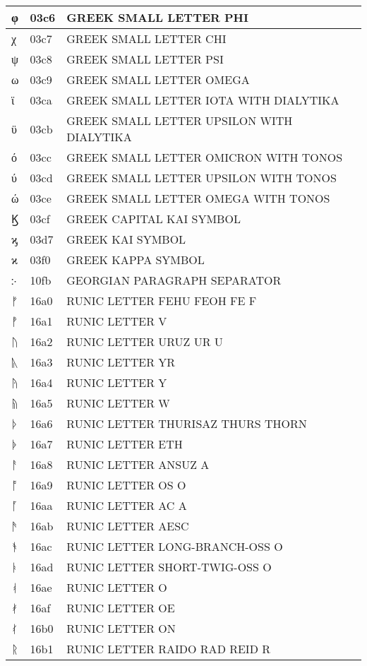 \documentclass[12pt,letterpaper,openany]{book}
\begin{document}
\begin{center}
\begin{supertabular}{|m{0.25in}|m{0.5in}|m{4in}|}
			φ & 03c6 & GREEK SMALL LETTER PHI\\\hline
			χ & 03c7 & GREEK SMALL LETTER CHI\\\hline
			ψ & 03c8 & GREEK SMALL LETTER PSI\\\hline
			ω & 03c9 & GREEK SMALL LETTER OMEGA\\\hline
			ϊ & 03ca & GREEK SMALL LETTER IOTA WITH DIALYTIKA\\\hline
			ϋ & 03cb & GREEK SMALL LETTER UPSILON WITH DIALYTIKA\\\hline
			ό & 03cc & GREEK SMALL LETTER OMICRON WITH TONOS\\\hline
			ύ & 03cd & GREEK SMALL LETTER UPSILON WITH TONOS\\\hline
			ώ & 03ce & GREEK SMALL LETTER OMEGA WITH TONOS\\\hline
			Ϗ & 03cf & GREEK CAPITAL KAI SYMBOL\\\hline
			ϗ & 03d7 & GREEK KAI SYMBOL\\\hline
			ϰ & 03f0 & GREEK KAPPA SYMBOL\\\hline
			჻ & 10fb & GEORGIAN PARAGRAPH SEPARATOR\\\hline
			ᚠ & 16a0 & RUNIC LETTER FEHU FEOH FE F\\\hline
			ᚡ & 16a1 & RUNIC LETTER V\\\hline
			ᚢ & 16a2 & RUNIC LETTER URUZ UR U\\\hline
			ᚣ & 16a3 & RUNIC LETTER YR\\\hline
			ᚤ & 16a4 & RUNIC LETTER Y\\\hline
			ᚥ & 16a5 & RUNIC LETTER W\\\hline
			ᚦ & 16a6 & RUNIC LETTER THURISAZ THURS THORN\\\hline
			ᚧ & 16a7 & RUNIC LETTER ETH\\\hline
			ᚨ & 16a8 & RUNIC LETTER ANSUZ A\\\hline
			ᚩ & 16a9 & RUNIC LETTER OS O\\\hline
			ᚪ & 16aa & RUNIC LETTER AC A\\\hline
			ᚫ & 16ab & RUNIC LETTER AESC\\\hline
			ᚬ & 16ac & RUNIC LETTER LONG-BRANCH-OSS O\\\hline
			ᚭ & 16ad & RUNIC LETTER SHORT-TWIG-OSS O\\\hline
			ᚮ & 16ae & RUNIC LETTER O\\\hline
			ᚯ & 16af & RUNIC LETTER OE\\\hline
			ᚰ & 16b0 & RUNIC LETTER ON\\\hline
			ᚱ & 16b1 & RUNIC LETTER RAIDO RAD REID R\\\hline

\end{supertabular}
\end{center}
\end{document}

